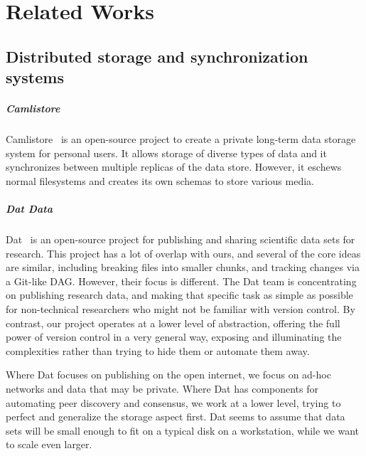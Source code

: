 \chapter{Related Works}


\section{Distributed storage and synchronization systems}

\paragraph{Camlistore}

Camlistore~\cite{camlistore_homepage} is an open-source project to create a
private long-term data storage system for personal users. It allows storage of
diverse types of data and it synchronizes between multiple replicas of the data
store. However, it eschews normal filesystems and creates its own schemas to
store various media.


\paragraph{Dat Data}

Dat~\cite{dat_homepage} is an open-source project for publishing and sharing
scientific data sets for research. This project has a lot of overlap with ours,
and several of the core ideas are similar, including breaking files into smaller
chunks, and tracking changes via a Git-like \gls{DAG}. However, their focus is
different. The Dat team is concentrating on publishing research data, and making
that specific task as simple as possible for non-technical researchers who might
not be familiar with version control. By contrast, our project operates at a
lower level of abstraction, offering the full power of version control in a very
general way, exposing and illuminating the complexities rather than trying to
hide them or automate them away.

Where Dat focuses on publishing on the open internet, we focus on ad-hoc
networks and data that may be private. Where Dat has components for automating
peer discovery and consensus, we work at a lower level, trying to perfect and
generalize the storage aspect first. Dat seems to assume that data sets will be
small enough to fit on a typical disk on a workstation, while we want to scale
even larger.

